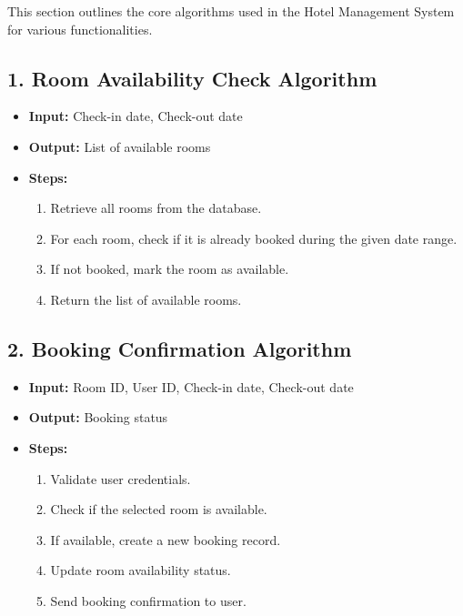 \documentclass[a4paper,12pt]{article}
\begin{document}
This section outlines the core algorithms used in the Hotel Management System for various functionalities.

\subsection{1. Room Availability Check Algorithm}
\begin{itemize}
    \item \textbf{Input:} Check-in date, Check-out date
    \item \textbf{Output:} List of available rooms
    \item \textbf{Steps:}
    \begin{enumerate}
        \item Retrieve all rooms from the database.
        \item For each room, check if it is already booked during the given date range.
        \item If not booked, mark the room as available.
        \item Return the list of available rooms.
    \end{enumerate}
\end{itemize}

\subsection{2. Booking Confirmation Algorithm}
\begin{itemize}
    \item \textbf{Input:} Room ID, User ID, Check-in date, Check-out date
    \item \textbf{Output:} Booking status
    \item \textbf{Steps:}
    \begin{enumerate}
        \item Validate user credentials.
        \item Check if the selected room is available.
        \item If available, create a new booking record.
        \item Update room availability status.
        \item Send booking confirmation to user.
    \end{enumerate}
\end{itemize}
\end{document}
